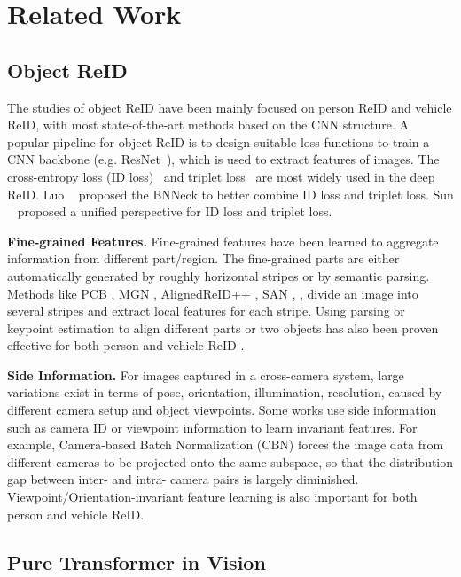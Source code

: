 \documentclass[10pt,twocolumn,letterpaper]{article}
\begin{document}
\section{Related Work}

\subsection{Object ReID}

The studies of object ReID have  been mainly focused on person ReID and vehicle ReID, with most state-of-the-art methods based on the CNN structure. A popular pipeline for object ReID is to design suitable loss functions to train a CNN backbone (e.g. ResNet~\cite{he2016deep}), which is used to extract features of images. The cross-entropy loss (ID loss)~\cite{zheng2018discriminatively} and triplet loss~\cite{liu2017end} are most widely used in the deep ReID. Luo \etal~\cite{luo2019bag} proposed the BNNeck to better combine ID loss and triplet loss. Sun \etal~\cite{Circle_loss} proposed a unified perspective for ID loss and triplet loss.

\textbf{Fine-grained Features.}  Fine-grained features have been learned to aggregate information from different part/region. The fine-grained parts are either automatically generated by roughly horizontal stripes or by semantic parsing. Methods like PCB \cite{PCB}, MGN \cite{MGN}, AlignedReID++ \cite{luo2019alignedreid++}, SAN \cite{qian2020stripe}, \etc, divide an image into several stripes and extract local features for each stripe. Using parsing or keypoint estimation to align different parts or two objects has also been proven effective for both person and vehicle ReID \cite{liu2020beyond,PVEN,wei2017glad,miao2019pose}.

\textbf{Side Information.} For images captured in a cross-camera system, large variations exist  in terms of  pose, orientation, illumination, resolution, \etc caused by different camera setup and object viewpoints. Some works \cite{camera-bn,chu2019vehicle} use side information such as camera ID or viewpoint information to learn invariant features. For example, Camera-based Batch Normalization (CBN) \cite{camera-bn} forces the image data from different cameras to be projected onto the same subspace, so that the distribution gap between inter- and intra- camera pairs is largely diminished. Viewpoint/Orientation-invariant feature learning \cite{chu2019vehicle,zhu2020aware} is also important for both person and vehicle ReID.

\subsection{Pure Transformer in Vision}
\end{document}
